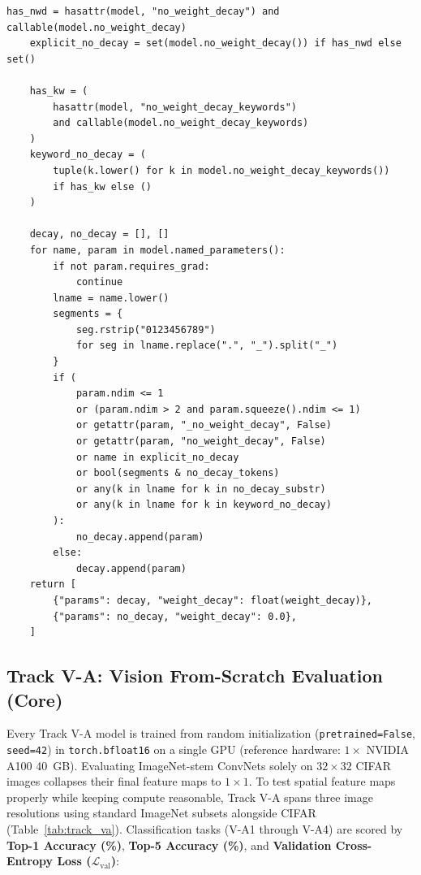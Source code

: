 \documentclass[11pt,a4paper]{article}
\renewcommand{\_}{\origunderscore\allowbreak}
\begin{document}
\begin{lstlisting}[caption={Standard LSO-Eval V-Eval: Vectorized PyTorch SimpleLion Optimizer (Chen et al., NeurIPS 2023, Algorithm 2) \& Decoupled Parameter Grouping}, label={lst:simplelion}]
    has_nwd = hasattr(model, "no_weight_decay") and callable(model.no_weight_decay)
    explicit_no_decay = set(model.no_weight_decay()) if has_nwd else set()

    has_kw = (
        hasattr(model, "no_weight_decay_keywords")
        and callable(model.no_weight_decay_keywords)
    )
    keyword_no_decay = (
        tuple(k.lower() for k in model.no_weight_decay_keywords())
        if has_kw else ()
    )

    decay, no_decay = [], []
    for name, param in model.named_parameters():
        if not param.requires_grad:
            continue
        lname = name.lower()
        segments = {
            seg.rstrip("0123456789")
            for seg in lname.replace(".", "_").split("_")
        }
        if (
            param.ndim <= 1
            or (param.ndim > 2 and param.squeeze().ndim <= 1)
            or getattr(param, "_no_weight_decay", False)
            or getattr(param, "no_weight_decay", False)
            or name in explicit_no_decay
            or bool(segments & no_decay_tokens)
            or any(k in lname for k in no_decay_substr)
            or any(k in lname for k in keyword_no_decay)
        ):
            no_decay.append(param)
        else:
            decay.append(param)
    return [
        {"params": decay, "weight_decay": float(weight_decay)},
        {"params": no_decay, "weight_decay": 0.0},
    ]
\end{lstlisting}

\subsection{Track V-A: Vision From-Scratch Evaluation (Core)}
\noindent
Every Track V-A model is trained from random initialization (\texttt{pretrained=False}, \texttt{seed=42}) in \texttt{torch.bfloat16} on a single GPU (reference hardware: $1\times$ NVIDIA A100 40~GB). Evaluating ImageNet-stem ConvNets solely on $32 \times 32$ CIFAR images collapses their final feature maps to $1 \times 1$. To test spatial feature maps properly while keeping compute reasonable, Track V-A spans three image resolutions using standard ImageNet subsets alongside CIFAR (Table~\ref{tab:track_va}). Classification tasks (V-A1 through V-A4) are scored by \textbf{Top-1 Accuracy (\%)}, \textbf{Top-5 Accuracy (\%)}, and \textbf{Validation Cross-Entropy Loss ($\mathcal{L}_{\text{val}}$)}:
\end{document}

